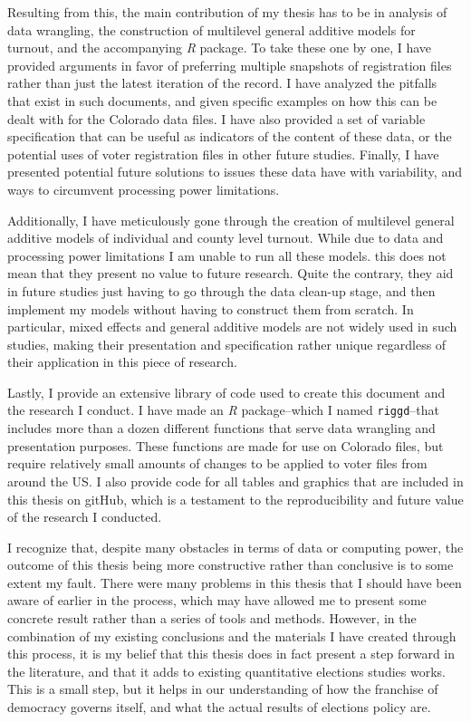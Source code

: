 \documentclass[12pt,twoside]{reedthesis}
\begin{document}
  Resulting from this, the main contribution of my thesis has to be in
  analysis of data wrangling, the construction of multilevel general
  additive models for turnout, and the accompanying \textit{R} package. To
  take these one by one, I have provided arguments in favor of preferring
  multiple snapshots of registration files rather than just the latest
  iteration of the record. I have analyzed the pitfalls that exist in such
  documents, and given specific examples on how this can be dealt with for
  the Colorado data files. I have also provided a set of variable
  specification that can be useful as indicators of the content of these
  data, or the potential uses of voter registration files in other future
  studies. Finally, I have presented potential future solutions to issues
  these data have with variability, and ways to circumvent processing
  power limitations.
  
  Additionally, I have meticulously gone through the creation of
  multilevel general additive models of individual and county level
  turnout. While due to data and processing power limitations I am unable
  to run all these models. this does not mean that they present no value
  to future research. Quite the contrary, they aid in future studies just
  having to go through the data clean-up stage, and then implement my
  models without having to construct them from scratch. In particular,
  mixed effects and general additive models are not widely used in such
  studies, making their presentation and specification rather unique
  regardless of their application in this piece of research.
  
  Lastly, I provide an extensive library of code used to create this
  document and the research I conduct. I have made an \textit{R}
  package--which I named \texttt{riggd}--that includes more than a dozen
  different functions that serve data wrangling and presentation purposes.
  These functions are made for use on Colorado files, but require
  relatively small amounts of changes to be applied to voter files from
  around the US. I also provide code for all tables and graphics that are
  included in this thesis on gitHub, which is a testament to the
  reproducibility and future value of the research I conducted.
  
  I recognize that, despite many obstacles in terms of data or computing
  power, the outcome of this thesis being more constructive rather than
  conclusive is to some extent my fault. There were many problems in this
  thesis that I should have been aware of earlier in the process, which
  may have allowed me to present some concrete result rather than a series
  of tools and methods. However, in the combination of my existing
  conclusions and the materials I have created through this process, it is
  my belief that this thesis does in fact present a step forward in the
  literature, and that it adds to existing quantitative elections studies
  works. This is a small step, but it helps in our understanding of how
  the franchise of democracy governs itself, and what the actual results
  of elections policy are.
  
\end{document}
